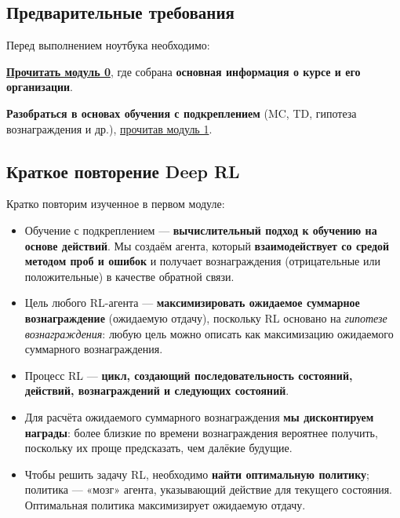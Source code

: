 \documentclass[11pt,a4paper]{article}
\begin{document}
\subsection{Предварительные требования}\label{prerequisites}

Перед выполнением ноутбука необходимо:

\textbf{\href{https://huggingface.co/deep-rl-course/unit0/introduction}{Прочитать модуль 0}}, где собрана \textbf{основная информация о курсе и его организации}.

\textbf{Разобраться в основах обучения с подкреплением} (MC, TD, гипотеза вознаграждения и др.), \href{https://huggingface.co/deep-rl-course/unit1/introduction}{прочитав модуль 1}.

\subsection{Краткое повторение Deep RL}\label{a-small-recap-of-deep-reinforcement-learning}


Кратко повторим изученное в первом модуле:

\begin{itemize}
\item
  Обучение с подкреплением --- \textbf{вычислительный подход к обучению на основе действий}. Мы создаём агента, который \textbf{взаимодействует со средой методом проб и ошибок} и получает вознаграждения (отрицательные или положительные) в качестве обратной связи.
\item
  Цель любого RL-агента --- \textbf{максимизировать ожидаемое суммарное вознаграждение} (ожидаемую отдачу), поскольку RL основано на \emph{гипотезе вознаграждения}: любую цель можно описать как максимизацию ожидаемого суммарного вознаграждения.
\item
  Процесс RL --- \textbf{цикл, создающий последовательность состояний, действий, вознаграждений и следующих состояний}.
\item
  Для расчёта ожидаемого суммарного вознаграждения \textbf{мы дисконтируем награды}: более близкие по времени вознаграждения вероятнее получить, поскольку их проще предсказать, чем далёкие будущие.
\item
  Чтобы решить задачу RL, необходимо \textbf{найти оптимальную политику}; политика --- «мозг» агента, указывающий действие для текущего состояния. Оптимальная политика максимизирует ожидаемую отдачу.
\end{itemize}
\end{document}
